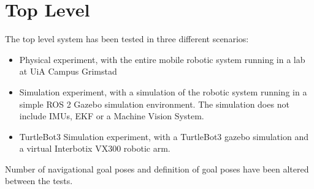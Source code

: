 

\section{Top Level} \label{sec:R:TopLevel}
The top level system has been tested in three different scenarios:
\begin{itemize}
    \item Physical experiment, with the entire mobile robotic system running in a lab at UiA Campus Grimstad
    \item Simulation experiment, with a simulation of the robotic system running in a simple ROS 2 Gazebo simulation environment. The simulation does not include IMUs, EKF or a Machine Vision System.
    \item TurtleBot3 Simulation experiment, with a TurtleBot3 gazebo simulation and a virtual Interbotix VX300 robotic arm.
\end{itemize}

Number of navigational goal poses and definition of goal poses have been altered between the tests.

